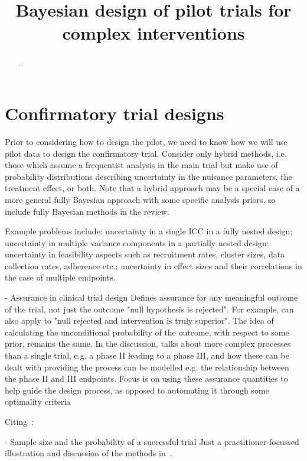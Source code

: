 \documentclass{article} %
\title{Bayesian design of pilot trials for complex interventions}
\date{}
\begin{document}
\maketitle

\begin{abstract}
\ldots
\end{abstract}

\section{Confirmatory trial designs}

Prior to considering how to design the pilot, we need to know how we will use pilot data to design the confirmatory trial. Consider only hybrid methods, i.e. those which assume a frequentist analysis in the main trial but make use of probability distributions describing uncertainty in the nuisance parameters, the treatment effect, or both. Note that a hybrid approach may be a special case of a more general fully Bayesian approach with some specific analysis priors, so include fully Bayesian methods in the review.

Example problems include: uncertainty in a single ICC in a fully nested design; uncertainty in multiple variance components in a partially nested design; uncertainty in feasibility aspects such as recruitment rates, cluster sizes, data collection rates, adherence etc.; uncertainty in effect sizes and their correlations in the case of multiple endpoints.

\cite{OHagan2005} - Assurance in clinical trial design
Defines assurance for any meaningful outcome of the trial, not just the outcome "null hypothesis is rejected". For example, can also apply to "null rejected and intervention is truly superior". The idea of calculating the unconditional probability of the outcome, with respect to some prior, remains the same. In the discussion, talks about more complex processes than a single trial, e.g. a phase II leading to a phase III, and how these can be dealt with providing the process can be modelled e.g. the relationship between the phase II and III endpoints. Focus is on using these assurance quantities to help guide the design process, as opposed to automating it through some optimality criteria

Citing~\cite{OHagan2005}:

\cite{Chuang-Stein2006} - Sample size and the probability of a successful trial
Just a practitioner-focussed illustration and discussion of the methods in~\cite{OHagan2005}. 
\end{document}
